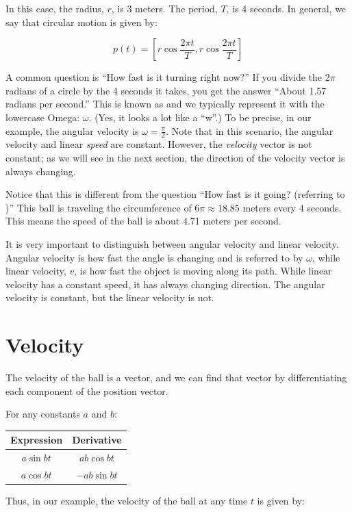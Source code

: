 In this case, the radius, $r$, is 3 meters.  The period, $T$, is 4
seconds.  In general, we say that circular motion is given by:

$$p(t) = \left[ r \cos{\frac{2 \pi t}{T}}, r \cos{\frac{2 \pi t}{T}}\right]$$

A common question is ``How fast is it turning right now?''  If you
divide the $2\pi$ radians of a circle by the 4 seconds it takes, you
get the answer ``About 1.57 radians per second.''  This is known as
 and we typically represent it with the
lowercase Omega: $\omega$. (Yes, it looks a lot like a ``w''.)  To be
precise, in our example, the angular velocity is $\omega = \frac{\pi}{2}$. Note that in this scenario, the angular velocity and linear \emph{speed} are constant. However, the \emph{velocity} vector is not constant; as we will see in the next section, the direction of the velocity vector is always changing.

Notice that this is different from the question ``How fast is it
going? (referring to )''  This ball is traveling the circumference of $6\pi \approx
18.85$ meters every 4 seconds.  This means the speed of the ball is about
4.71 meters per second.

It is very important to distinguish between angular velocity and linear velocity. Angular velocity is how fast the angle is changing and is referred to by $\omega$, while linear velocity, $v$, is how fast the object is moving along its path. While linear velocity has a constant speed, it has always changing direction. The angular velocity is constant, but the linear velocity is not.

\section{Velocity}

The velocity of the ball is a vector, and we can find that vector by
differentiating each component of the position vector.

For any constants $a$ and $b$:

\begin{tabular}{c | c }
  Expression & Derivative \\
  \hline
  $a \sin{b t}$ & $ab \cos{b t}$ \\
  $a \cos{b t}$ & $-ab \sin{b t}$  \\
\end{tabular}

Thus, in our example, the velocity of the ball at any time $t$ is given by:

